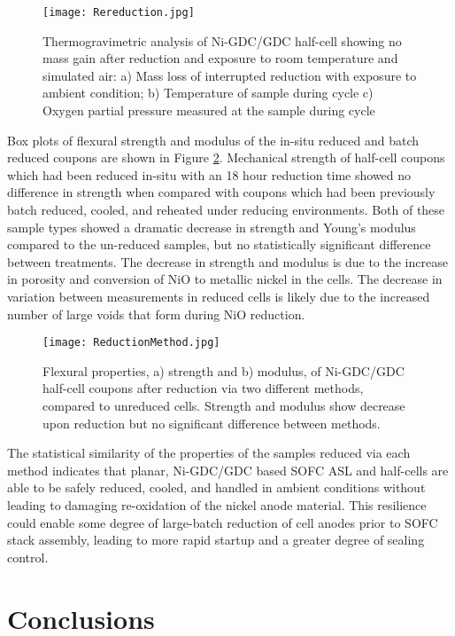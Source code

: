 \begin{figure}
    \texttt{[image: Rereduction.jpg]}
    \caption{Thermogravimetric analysis of Ni-GDC/GDC half-cell showing no mass gain after reduction and exposure to room temperature and simulated air: a) Mass loss of interrupted reduction with exposure to ambient condition; b) Temperature of sample during cycle c) Oxygen partial pressure measured at the sample during cycle}
    \label{fig:rereduction}
\end{figure}

Box plots of flexural strength and modulus of the in-situ reduced and batch reduced coupons are shown in Figure \ref{fig:reductionmethod}.
Mechanical strength of half-cell coupons which had been reduced in-situ with an 18 hour reduction time showed no difference in strength when compared with coupons which had been previously batch reduced, cooled, and reheated under reducing environments.
Both of these sample types showed a dramatic decrease in strength and Young's modulus compared to the un-reduced samples, but no statistically significant difference between treatments.
The decrease in strength and modulus is due to the increase in porosity and conversion of NiO to metallic nickel in the cells.
The decrease in variation between measurements in reduced cells is likely due to the increased number of large voids that form during NiO reduction.

\begin{figure}
    \texttt{[image: ReductionMethod.jpg]}
    \caption{Flexural properties, a) strength and b) modulus, of Ni-GDC/GDC half-cell coupons after reduction via two different methods, compared to unreduced cells. Strength and modulus show decrease upon reduction but no significant difference between methods.}
    \label{fig:reductionmethod}
\end{figure}

The statistical similarity of the properties of the samples reduced via each method indicates that planar, Ni-GDC/GDC based SOFC ASL and half-cells are able to be safely reduced, cooled, and handled in ambient conditions without leading to damaging re-oxidation of the nickel anode material.
This resilience could enable some degree of large-batch reduction of cell anodes prior to SOFC stack assembly, leading to more rapid startup and a greater degree of sealing control.

\section{Conclusions}

